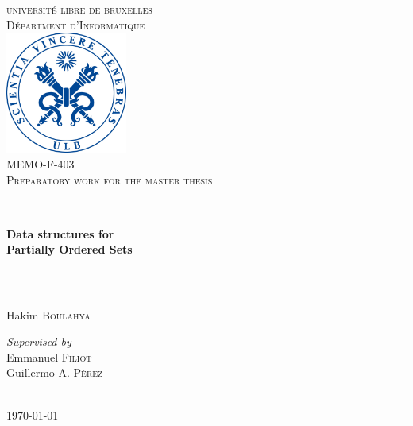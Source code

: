 \documentclass[letterpaper]{article}
\theoremstyle{definition}
\newcommand{\HRule}{\rule{\linewidth}{0.2mm}} %
\begin{document}
\begin{titlepage}

\begin{center}


\textsc{\LARGE universit\'e libre de bruxelles}\\[1.0cm]
\textsc{\Large D\'epartment d'Informatique}\\[1.0cm]

\includegraphics[width=0.3\textwidth]{images/ulblogo.jpg}~\\[1cm]

\textsc{
\large MEMO-F-403 \\
\Large  Preparatory work for the master thesis
 \\[1.0cm]}
\HRule \\[0.3cm]

{ \huge \bfseries Data structures for \\
Partially Ordered Sets \\[0.3cm] }

\HRule \\[1cm]

\noindent
\begin{center} \large

\Large Hakim \textsc{Boulahya}\\
\end{center}
\begin{center} \large

\emph{Supervised by} \\
\Large Emmanuel \textsc{Filiot} \\
\Large Guillermo A. \textsc{Pérez} \\

\end{center}

\\[1cm]
{\large \today}

\end{center}
\end{titlepage}
\end{document}
